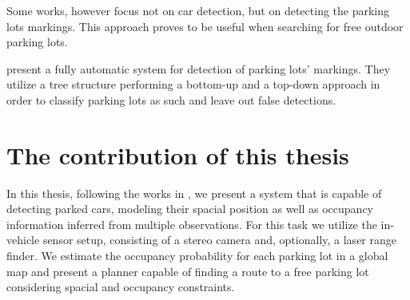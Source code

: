 Some works, however focus not on car detection, but on detecting the parking
lots markings. This approach proves to be useful when searching for free
outdoor parking lots.

\citet{suhr13} present a fully automatic system for detection of parking lots'
markings. They utilize a tree structure performing a bottom-up and a top-down
approach in order to classify parking lots as such and leave out false
detections.


\section{The contribution of this thesis} %
\label{sec:the_contribution_of_this_thesis}

In this thesis, following the works in , we
present a system that is capable of detecting parked cars, modeling their
spacial position as well as occupancy information inferred from multiple
observations. For this task we utilize the in-vehicle sensor setup, consisting
of a stereo camera and, optionally, a laser range finder. We estimate the
occupancy probability for each parking lot in a global map and present a
planner capable of finding a route to a free parking lot considering spacial
and occupancy constraints.

